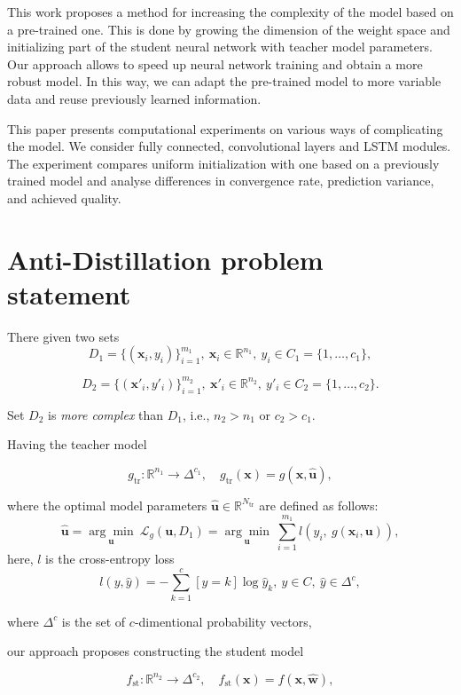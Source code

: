 \documentclass[80pt]{article}
\begin{document}
This work proposes a method for increasing the complexity of the model based on a pre-trained one. This is done by growing the dimension of the weight space and initializing part of the student neural network with teacher model parameters. Our approach allows to speed up neural network training and obtain a more robust model. In this way, we can adapt the pre-trained model to more variable data and reuse previously learned information.

This paper presents computational experiments on various ways of complicating the model. We consider fully connected, convolutional layers and LSTM modules. The experiment compares uniform initialization with one based on a previously trained model and analyse differences in convergence rate, prediction variance, and achieved quality.

\section{Anti-Distillation problem statement}
There given two sets
$$D_1 = \{(\mathbf{x}_i, y_i)\}_{i=1}^{m_1},~\mathbf{x}_i \in \mathbb{R}^{n_1},~y_i \in C_1 = \{1, \dots, c_1\},$$

$$D_2 =  \{(\mathbf{x}'_i, y'_i)\}_{i=1}^{m_2},~\mathbf{x}'_i \in \mathbb{R}^{n_2},~y'_i \in C_2 = \{1, \dots, c_2\}.$$

Set $D_2$ is \textit{more complex} than $D_1$, i.e., $n_2 > n_1$ or $c_2 > c_1$.

Having the teacher model 

\[g_\text{tr}: \mathbb{R}^{n_1} \rightarrow \Delta^{c_1},\quad g_\text{tr}(\mathbf{x}) = g(\mathbf{x}, \hat{\mathbf{u}}),\] 

where the optimal model parameters $\hat{\mathbf{u}} \in \mathbb{R}^{N_{\text{tr}}}$ are defined as follows:
$$\hat{\mathbf{u}} =  \underset{\mathbf{u}}{\arg\min}~\mathcal{L}_g(\mathbf{u}, D_1) =\underset{\mathbf{u}}{\arg\min}~\sum\limits_{i=1}^{m_1} l \left(y_i,~g(\mathbf{x}_i, \mathbf{u})\right),$$
here, $l$ is the cross-entropy loss 
$$l(y, \hat{y}) = -\sum\limits_{k=1}^{c} [y = k] \log{\hat{y}_k},~y \in C,~\hat{y} \in \Delta^c,$$

where $\Delta^c$ is the set of $c$-dimentional probability vectors,

our approach proposes constructing the student model

\[f_\text{st}: \mathbb{R}^{n_2} \rightarrow \Delta^{c_2},\quad f_\text{st}(\mathbf{x}) = f(\mathbf{x}, \hat{\mathbf{w}}),\]
\end{document}
